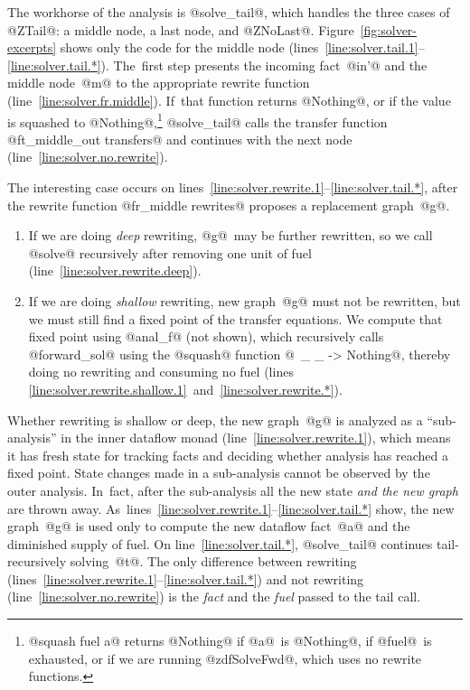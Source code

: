 \documentclass[blockstyle,preprint,natbib,nocopyrightspace]{sigplanconf}
\newcommand\lineref[1]{line~\ref{line:#1}}
\newcommand\linepairref[2]{lines \ref{line:#1}~and~\ref{line:#2}}
\newcommand\linerangeref[2]{\mbox{lines~\ref{line:#1}--\ref{line:#2}}}
\def\finalremark#1{\relax}
\newcommand\figref[1]{Figure~\ref{fig:#1}}
\begin{document}
The workhorse of the analysis is @solve_tail@, which handles the three
cases of @ZTail@: a middle node, a last node, and @ZNoLast@.
\figref{solver-excerpts} shows only the code for the middle node
(\linerangeref{solver.tail.1}{solver.tail.*}).
The~first step presents the incoming fact~@in'@ and the middle
node~@m@ to the appropriate rewrite function (\lineref{solver.fr.middle}).
If~that function returns @Nothing@, or if the value is squashed to
@Nothing@,\footnote
{@squash fuel a@ returns @Nothing@ if @a@~is @Nothing@, if @fuel@~is
  exhausted, or if we are running @zdfSolveFwd@, which uses no rewrite
  functions.
}
@solve_tail@
calls the transfer function
@ft_middle_out transfers@ and continues with the next node
(\lineref{solver.no.rewrite}). 



The interesting case occurs on \linerangeref{solver.rewrite.1}{solver.tail.*},
after the rewrite function 
@fr_middle rewrites@
proposes a replacement graph~@g@.\finalremark
{Orphaned text:
and
a list of facts that hold on edges leaving the graph, which is  
 extracted using function @zdfFpLastOuts@.
\iffalse %
In the example above, when the subgraph
@z = 7 + y@ is analyzed, @zdfFpLastOuts@ will contain
the pair $(@L2@, @x == 7@ \land @y == 8@)$.
\fi
}
\begin{enumerate}
\item
If we are doing \emph{deep} rewriting, @g@~may be further rewritten,
so we call @solve@ recursively after removing one unit of fuel (\lineref{solver.rewrite.deep}).
\item
If we are doing \emph{shallow} rewriting,  new graph~@g@ must not be
rewritten, but we must still find a fixed point of the transfer
equations.
We compute that fixed point using @anal_f@ (not shown), which  recursively calls
@forward_sol@ using the @squash@ function
@\ _ _ -> Nothing@, 
thereby doing no rewriting and consuming no fuel
(\linepairref{solver.rewrite.shallow.1}{solver.rewrite.*}).

\end{enumerate}
Whether rewriting is shallow or deep, the new graph~@g@ is analyzed as
a ``sub-analysis'' in the inner dataflow monad
(\lineref{solver.rewrite.1}), which means it has fresh 
state for tracking facts and deciding whether analysis has reached a
fixed point.
State changes made in a sub-analysis cannot be observed by the outer
analysis. 
In~fact, after the sub-analysis all the new state \emph{and the new
  graph} are thrown away.
As~\linerangeref{solver.rewrite.1}{solver.tail.*} show, the new
graph~@g@ is used only to compute the new 
dataflow fact~@a@ and the diminished
supply of fuel.
On \lineref{solver.tail.*}, @solve_tail@ continues tail-recursively solving~@t@.
The only difference between rewriting
(\linerangeref{solver.rewrite.1}{solver.tail.*}) and not 
rewriting (\lineref{solver.no.rewrite}) is the
\emph{fact} and the \emph{fuel} passed to the tail call.
\end{document}
